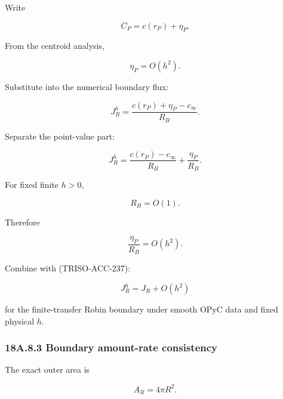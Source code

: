 \documentclass[11pt,a4paper]{article}
\begin{document}
Write

\begin{equation}
C_P=c(r_P)+\eta_P.
\tag{TRISO-ACC-238}
\label{eq:triso-acc-238}
\end{equation}

From the centroid analysis,

\begin{equation}
\eta_P=O(h^2).
\tag{TRISO-ACC-239}
\label{eq:triso-acc-239}
\end{equation}

Substitute into the numerical boundary flux:

\begin{equation}
J_R^h
=
\frac{
c(r_P)+\eta_P-c_\infty
}{
R_B
}.
\tag{TRISO-ACC-240}
\label{eq:triso-acc-240}
\end{equation}

Separate the point-value part:

\begin{equation}
J_R^h
=
\frac{
c(r_P)-c_\infty
}{
R_B
}
+
\frac{\eta_P}{R_B}.
\tag{TRISO-ACC-241}
\label{eq:triso-acc-241}
\end{equation}

For fixed finite $h>0$,

\begin{equation}
R_B=O(1).
\tag{TRISO-ACC-242}
\label{eq:triso-acc-242}
\end{equation}

Therefore

\begin{equation}
\frac{\eta_P}{R_B}=O(h^2).
\tag{TRISO-ACC-243}
\label{eq:triso-acc-243}
\end{equation}

Combine with (TRISO-ACC-237):

\begin{equation}
\boxed{
J_R^h
=
J_R+O(h^2)
}
\tag{TRISO-ACC-244}
\label{eq:triso-acc-244}
\end{equation}

for the finite-transfer Robin boundary under smooth OPyC data and fixed physical $h$.

\subsubsection*{18A.8.3 Boundary amount-rate consistency}

The exact outer area is

\begin{equation}
A_R=4\pi R^2.
\tag{TRISO-ACC-245}
\label{eq:triso-acc-245}
\end{equation}
\end{document}
